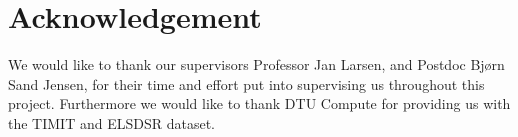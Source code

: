 \section{Acknowledgement}

We would like to thank our supervisors Professor Jan Larsen, and Postdoc Bjørn Sand Jensen, for their time and effort put into supervising us throughout this project. Furthermore we would like to thank DTU Compute for providing us with the TIMIT and ELSDSR dataset.
